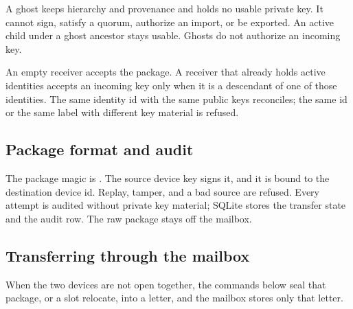 \begin{noteBox}
A ghost keeps hierarchy and provenance and holds no usable private key. It
cannot sign, satisfy a quorum, authorize an import, or be exported. An
active child under a ghost ancestor stays usable. Ghosts do not authorize an
incoming key.
\end{noteBox}

An empty receiver accepts the package. A receiver that already holds active
identities accepts an incoming key only when it is a descendant of one of
those identities. The same identity id with the same public keys reconciles;
the same id or the same label with different key material is refused.

\subsection{Package format and audit}

The package magic is . The source device key signs it, and it is
bound to the destination device id. Replay, tamper, and a bad source are
refused. Every attempt is audited without private key material; SQLite
stores the transfer state and the audit row. The raw  package
stays off the mailbox.

\subsection{Transferring through the mailbox}

When the two devices are not open together, the commands below seal that
package, or a slot relocate, into a  letter, and the mailbox
stores only that letter.


